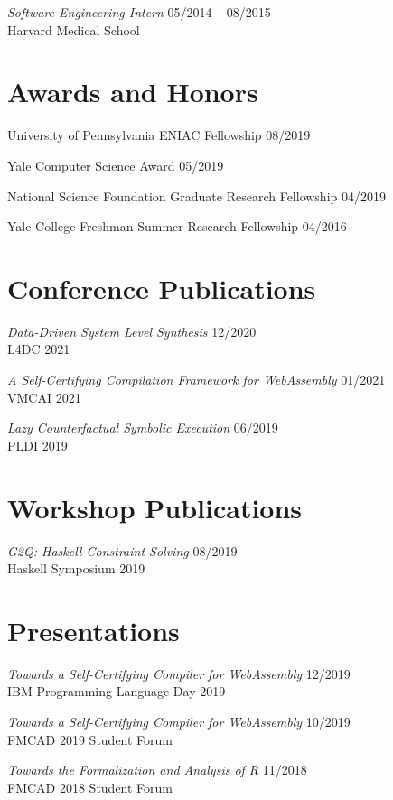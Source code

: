 \documentclass[margin]{res}
\begin{document}
\begin{resume}
\textit{Software Engineering Intern} \hfill 05/2014 -- 08/2015 \\
Harvard Medical School


\section{Awards and Honors}
University of Pennsylvania ENIAC Fellowship \hfill 08/2019

Yale Computer Science Award \hfill 05/2019

National Science Foundation Graduate Research Fellowship \hfill 04/2019

Yale College Freshman Summer Research Fellowship \hfill 04/2016


\section{Conference Publications}
\textit{Data-Driven System Level Synthesis} \hfill 12/2020 \\
L4DC 2021

\textit{A Self-Certifying Compilation Framework for WebAssembly} \hfill 01/2021 \\
VMCAI 2021

\textit{Lazy Counterfactual Symbolic Execution} \hfill 06/2019 \\
PLDI 2019

\section{Workshop Publications}

\textit{G2Q: Haskell Constraint Solving} \hfill 08/2019 \\
Haskell Symposium 2019


\section{Presentations}
\textit{Towards a Self-Certifying Compiler for WebAssembly} \hfill 12/2019 \\
  IBM Programming Language Day 2019

\textit{Towards a Self-Certifying Compiler for WebAssembly} \hfill 10/2019 \\
  FMCAD 2019 Student Forum

\textit{Towards the Formalization and Analysis of R} \hfill 11/2018 \\
  FMCAD 2018 Student Forum


\end{resume}
\end{document}
